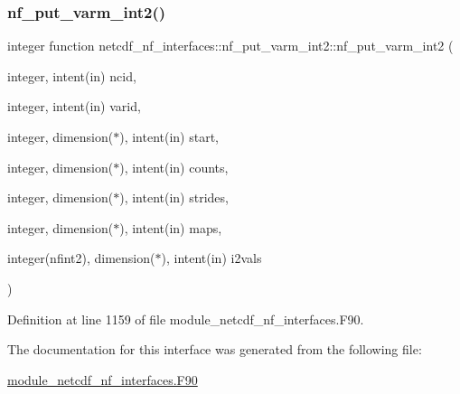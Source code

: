 \subsubsection{\texorpdfstring{nf\+\_\+put\+\_\+varm\+\_\+int2()}{nf\_put\_varm\_int2()}}
{\footnotesize\ttfamily integer function netcdf\+\_\+nf\+\_\+interfaces\+::nf\+\_\+put\+\_\+varm\+\_\+int2\+::nf\+\_\+put\+\_\+varm\+\_\+int2 (\begin{DoxyParamCaption}\item[{integer, intent(in)}]{ncid,  }\item[{integer, intent(in)}]{varid,  }\item[{integer, dimension($\ast$), intent(in)}]{start,  }\item[{integer, dimension($\ast$), intent(in)}]{counts,  }\item[{integer, dimension($\ast$), intent(in)}]{strides,  }\item[{integer, dimension($\ast$), intent(in)}]{maps,  }\item[{integer(nfint2), dimension($\ast$), intent(in)}]{i2vals }\end{DoxyParamCaption})}



Definition at line 1159 of file module\+\_\+netcdf\+\_\+nf\+\_\+interfaces.\+F90.



The documentation for this interface was generated from the following file\+:\begin{DoxyCompactItemize}
\item 
\hyperlink{module__netcdf__nf__interfaces_8F90}{module\+\_\+netcdf\+\_\+nf\+\_\+interfaces.\+F90}\end{DoxyCompactItemize}
